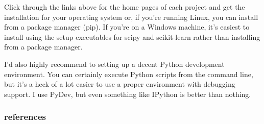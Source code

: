 \documentclass[11pt]{article} %
\begin{document}
Click through the links above for the home pages of each project and get the installation for your operating system or, if you're running Linux, you can install from a package manager (pip). If you're on a Windows machine, it's easiest to install using the setup executables for scipy and scikit-learn rather than installing from a package manager.

I'd also highly recommend to setting up a decent Python development environment. You can certainly execute Python scripts from the command line, but it's a heck of a lot easier to use a proper environment with debugging support. I use PyDev, but even something like IPython is better than nothing.


\subsubsection*{references}


\newpage








%

% 




\end{document}
